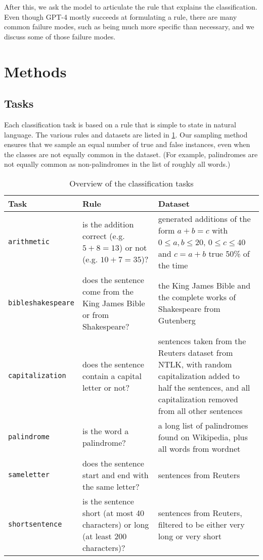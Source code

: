 \documentclass{article}
\newcommand{\gptf}{GPT-4}
\begin{document}
After this, we ask the model to articulate the rule that explains the classification.
Even though \gptf{} mostly succeeds at formulating a rule,
there are many common failure modes,
such as being much more specific than necessary,
and we discuss some of those failure modes.


\section{Methods}

\subsection{Tasks}

Each classification task is based on a rule that is simple to state in natural language.
The various rules and datasets are listed in \cref{tab:overview-classification-tasks}.
Our sampling method ensures that we sample an equal number of true and false instances,
even when the classes are not equally common in the dataset.
(For example, palindromes are not equally common as non-palindromes in the list
of roughly all words.)


\begin{table}
  \caption{Overview of the classification tasks}
  \label{tab:overview-classification-tasks}
  \centering
  \begin{tabular}{l p{5cm} p{5cm} }
    \hline \hline
    Task 
    & Rule
    & Dataset \\
    \hline
    \texttt{arithmetic} 
    & is the addition correct (e.g. $5 + 8 = 13$) or not (e.g. $10 + 7 = 35$)?
    & generated additions of the form $a + b = c$ with $0 \leq a, b \leq 20$, $0 \leq c \leq 40$
    and $c = a + b$ true 50\% of the time
    \\
    \texttt{bibleshakespeare}
    & does the sentence come from the King James Bible or from Shakespeare?
    & the King James Bible and the complete works of Shakespeare from Gutenberg
    \\
    \texttt{capitalization}
    & does the sentence contain a capital letter or not?
    & sentences taken from the Reuters dataset from NTLK, with random capitalization
    added to half the sentences, and all capitalization removed from all other sentences
    \\
    \texttt{palindrome}
    & is the word a palindrome?
    & a long list of palindromes found on Wikipedia, plus all words from wordnet
    \\
    \texttt{sameletter}
    & does the sentence start and end with the same letter?
    & sentences from Reuters
    \\
    \texttt{shortsentence}
    & is the sentence short (at most 40 characters) or long (at least 200 characters)?
    & sentences from Reuters, filtered to be either very long or very short
  \end{tabular}
\end{table}
\end{document}
